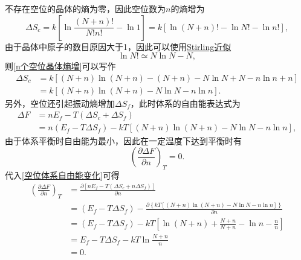             不存在空位的晶体的熵为零，因此空位数为$n$的熵增为
            \begin{equation}
                \Delta S_c=k\left[ \ln\frac{\left( N+n \right)!}{N!n!} -\ln1\right]=k\left[\ln (N+n) !-\ln N !-\ln n !\right]\label{n个空位晶体熵增},
            \end{equation}
            由于晶体中原子的数目原因大于1，因此可以使用\href{https://baike.baidu.com/item/%E6%96%AF%E7%89%B9%E6%9E%97%E5%85%AC%E5%BC%8F}{Stirling近似}
            \begin{equation}
                \ln{N!}\simeq N\ln N-N,
            \end{equation}
            则\autoref{n个空位晶体熵增}可以写作
            \begin{equation}
                \begin{aligned}
                    \Delta S_c&=k\left[ (N+n)\ln(N+n) -(N+n)-N\ln N+N-n\ln n+n\right]\\
                    &=k\left[ (N+n)\ln(N+n)-N\ln N-n\ln n \right].
                \end{aligned}
            \end{equation}
            另外，空位还引起振动熵增加$\Delta S_f$，此时体系的自由能表达式为
            \begin{equation}
                \begin{aligned}
                    \Delta F&=nE_f-T(\Delta S_c+\Delta S_f)\\
                    &=n(E_f-T\Delta S_f)-kT\left[ (N+n)\ln(N+n)-N\ln N-n\ln n \right],
                \end{aligned}\label{空位体系自由能变化}
            \end{equation}
            由于体系平衡时自由能为最小，因此在一定温度下达到平衡时有
            \begin{equation}
                \left( \frac{\partial \Delta F}{\partial n} \right)_T=0.
            \end{equation}
            代入\autoref{空位体系自由能变化}可得
            \begin{equation}
                \begin{aligned}
                    \left( \frac{\partial \Delta F}{\partial n} \right)_T&=\frac{\partial\left[n E_{f}-T\left(\Delta S_c+n \Delta S_{f}\right)\right]}{\partial n}\\
                    &=(E_f-T\Delta S_f)-\frac{\partial\left\{k T[(N+n) \ln (N+n)-N \ln N-n \ln n]\right\}}{\partial n}\\
                    &=\left(E_{f}-T \Delta S_{f}\right)-k T\left[\ln (N+n)+\frac{N+n}{N+n}-\ln n-\frac{n}{n}\right]\\
                    &=E_{f}-T \Delta S_{f}-k T \ln \frac{N+n}{n}\\
                    &=0.
                \end{aligned}
            \end{equation}
